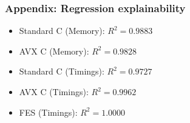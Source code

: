 \documentclass{beamer}
\begin{document}
\begin{frame}
    \frametitle{Appendix: Regression explainability}
    \begin{itemize}
        \item[] Standard C (Memory): $R^2 = 0.9883$
        \vspace{0.5cm}
        \item[] AVX C (Memory): $R^2 = 0.9828$
        \vspace{0.5cm}
        \item[] Standard C (Timings): $R^2 = 0.9727$
        \vspace{0.5cm}
        \item[] AVX C (Timings): $R^2 = 0.9962$
        \vspace{0.5cm}
        \item[] FES (Timings): $R^2 = 1.0000$
    \end{itemize}
\end{frame}
\end{document}
